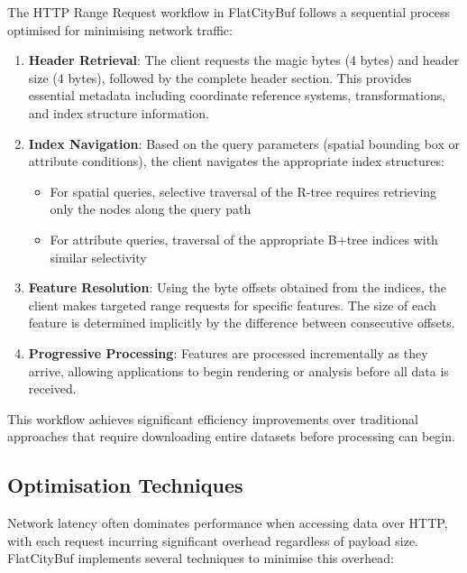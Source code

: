 The HTTP Range Request workflow in FlatCityBuf follows a sequential process optimised for minimising network traffic:

\begin{enumerate}
    \item \textbf{Header Retrieval}: The client requests the magic bytes (4 bytes) and header size (4 bytes), followed by the complete header section. This provides essential metadata including coordinate reference systems, transformations, and index structure information.

    \item \textbf{Index Navigation}: Based on the query parameters (spatial bounding box or attribute conditions), the client navigates the appropriate index structures:
    \begin{itemize}
        \item For spatial queries, selective traversal of the R-tree requires retrieving only the nodes along the query path
        \item For attribute queries, traversal of the appropriate B+tree indices with similar selectivity
    \end{itemize}

    \item \textbf{Feature Resolution}: Using the byte offsets obtained from the indices, the client makes targeted range requests for specific features. The size of each feature is determined implicitly by the difference between consecutive offsets.

    \item \textbf{Progressive Processing}: Features are processed incrementally as they arrive, allowing applications to begin rendering or analysis before all data is received.
\end{enumerate}

This workflow achieves significant efficiency improvements over traditional approaches that require downloading entire datasets before processing can begin.

\subsection{Optimisation Techniques}
\label{methodology:http_range_requests:range_request_optimisations}

Network latency often dominates performance when accessing data over HTTP, with each request incurring significant overhead regardless of payload size. FlatCityBuf implements several techniques to minimise this overhead:

